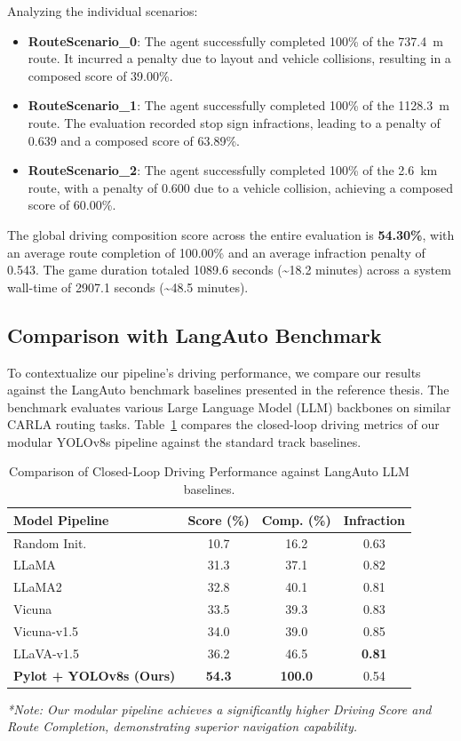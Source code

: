 \documentclass[11pt,a4paper]{report}
\begin{document}
Analyzing the individual scenarios:
\begin{itemize}
    \item \textbf{RouteScenario\_0}: The agent successfully completed 100\% of the 737.4~m route. It incurred a penalty due to layout and vehicle collisions, resulting in a composed score of 39.00\%.
    \item \textbf{RouteScenario\_1}: The agent successfully completed 100\% of the 1128.3~m route. The evaluation recorded stop sign infractions, leading to a penalty of 0.639 and a composed score of 63.89\%.
    \item \textbf{RouteScenario\_2}: The agent successfully completed 100\% of the 2.6~km route, with a penalty of 0.600 due to a vehicle collision, achieving a composed score of 60.00\%.
\end{itemize}

The global driving composition score across the entire evaluation is \textbf{54.30\%}, with an average route completion of 100.00\% and an average infraction penalty of 0.543. The game duration totaled 1089.6 seconds (\textasciitilde18.2 minutes) across a system wall-time of 2907.1 seconds (\textasciitilde48.5 minutes).

\subsection{Comparison with LangAuto Benchmark}
To contextualize our pipeline's driving performance, we compare our results against the LangAuto benchmark baselines presented in the reference thesis. The benchmark evaluates various Large Language Model (LLM) backbones on similar CARLA routing tasks. Table~\ref{tab:thesis_comparison} compares the closed-loop driving metrics of our modular YOLOv8s pipeline against the standard track baselines.

\begin{table}[h!]
\centering
\begin{tabular}{lccc}
\toprule
\textbf{Model Pipeline} & \textbf{Score (\%)} & \textbf{Comp. (\%)} & \textbf{Infraction} \\
\midrule
Random Init. & 10.7 & 16.2 & 0.63 \\
LLaMA & 31.3 & 37.1 & 0.82 \\
LLaMA2 & 32.8 & 40.1 & 0.81 \\
Vicuna & 33.5 & 39.3 & 0.83 \\
Vicuna-v1.5 & 34.0 & 39.0 & 0.85 \\
LLaVA-v1.5 & 36.2 & 46.5 & \textbf{0.81} \\
\midrule
\textbf{Pylot + YOLOv8s (Ours)} & \textbf{54.3} & \textbf{100.0} & 0.54 \\
\bottomrule
\end{tabular}
\vspace{1ex}

{\small \textit{*Note: Our modular pipeline achieves a significantly higher Driving Score and Route Completion, demonstrating superior navigation capability.}}
\caption{Comparison of Closed-Loop Driving Performance against LangAuto LLM baselines.}
\label{tab:thesis_comparison}
\end{table}
\end{document}
